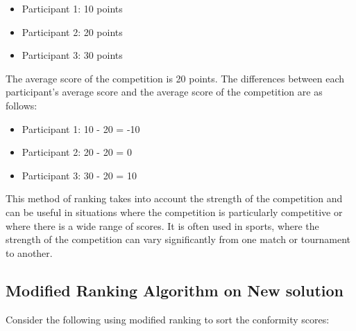 \begin{itemize}
	\item Participant 1: 10 points
	\item Participant 2: 20 points
	\item Participant 3: 30 points
\end{itemize}

The average score of the competition is 20 points. The differences between each participant's average score and the average score of the competition are as follows:

\begin{itemize}
	\item Participant 1: 10 - 20 = -10
	\item Participant 2: 20 - 20 = 0
	\item  Participant 3: 30 - 20 = 10
\end{itemize}
This method of ranking takes into account the strength of the competition and can be useful in situations where the competition is particularly competitive or where there is a wide range of scores. It is often used in sports, where the strength of the competition can vary significantly from one match or tournament to another.

\subsection{Modified Ranking Algorithm on New solution}
Consider the following using modified ranking to sort the conformity scores:

